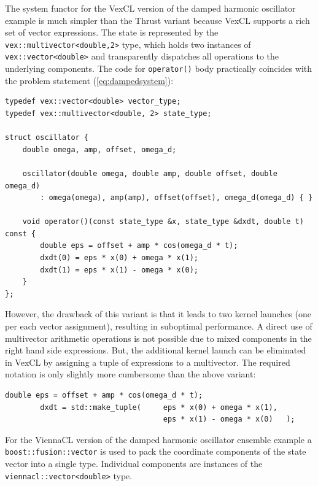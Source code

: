 \documentclass[final]{siamltex}
\newcommand{\code}[1]{\lstinline|#1|}
\newcommand{\eqref}[1]{(\ref{#1})}
\begin{document}
The system functor for the VexCL version of the damped harmonic oscillator
example is much simpler than the Thrust variant because VexCL supports a rich
set of vector expressions. The state is represented by the
\code{vex::multivector<double,2>} type, which holds two instances of
\code{vex::vector<double>} and transparently dispatches all operations to the
underlying components. The code for \code{operator()} body practically
coincides with the problem statement \eqref{eq:dampedsystem}:
\begin{lstlisting}
typedef vex::vector<double> vector_type;
typedef vex::multivector<double, 2> state_type;

struct oscillator {
    double omega, amp, offset, omega_d;

    oscillator(double omega, double amp, double offset, double omega_d)
        : omega(omega), amp(amp), offset(offset), omega_d(omega_d) { }

    void operator()(const state_type &x, state_type &dxdt, double t) const {
        double eps = offset + amp * cos(omega_d * t);
        dxdt(0) = eps * x(0) + omega * x(1);
        dxdt(1) = eps * x(1) - omega * x(0);
    }
};
\end{lstlisting}


However, the drawback of this variant is that it leads
to two kernel launches (one per each vector assignment), resulting in
suboptimal performance. A direct use of multivector arithmetic
operations is not possible due to mixed components in the right hand side expressions. 
But, the additional kernel launch can be eliminated in VexCL by assigning a tuple of expressions to a multivector.
The required notation is only slightly more cumbersome than the above variant:
\begin{lstlisting}[firstnumber=11]
        double eps = offset + amp * cos(omega_d * t);
        dxdt = std::make_tuple(     eps * x(0) + omega * x(1),
                                    eps * x(1) - omega * x(0)   );
\end{lstlisting}

For the ViennaCL version of the damped harmonic oscillator ensemble example a
\code{boost::fusion::vector} is used to pack the coordinate components of the state vector into a
single type. Individual components are instances of the
\code{viennacl::vector<double>} type.
\end{document}

